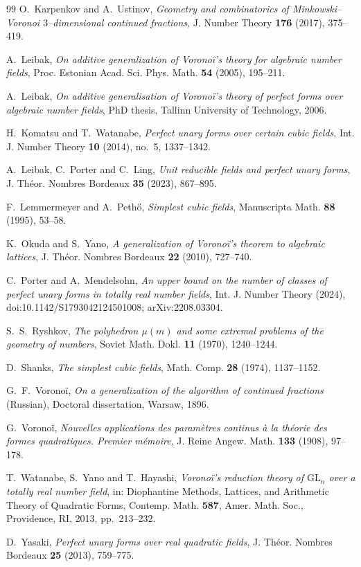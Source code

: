 \documentclass[11pt,reqno]{amsart}
\theoremstyle{plain}
\theoremstyle{definition}
\newcommand{\GL}{\mathrm{GL}}
\begin{document}
\begin{thebibliography}{99}
O.~Karpenkov and A.~Ustinov, \emph{Geometry and combinatorics of Minkowski--Voronoi $3$--dimensional
continued fractions}, J. Number Theory \textbf{176} (2017), 375--419.

A.~Leibak, \emph{On additive generalization of Vorono\"i's theory for algebraic number fields}, Proc.
Estonian Acad. Sci. Phys. Math. \textbf{54} (2005), 195--211.

A.~Leibak, \emph{On additive generalisation of Vorono\"i's theory of perfect forms over algebraic number
fields}, PhD thesis, Tallinn University of Technology, 2006.

H.~Komatsu and T.~Watanabe, \emph{Perfect unary forms over certain cubic fields}, Int. J. Number Theory
\textbf{10} (2014), no.~5, 1337--1342.

A.~Leibak, C.~Porter and C.~Ling, \emph{Unit reducible fields and perfect unary forms}, J. Th\'eor. Nombres
Bordeaux \textbf{35} (2023), 867--895.

F.~Lemmermeyer and A.~Peth\H o, \emph{Simplest cubic fields}, Manuscripta Math. \textbf{88} (1995),
53--58.

K.~Okuda and S.~Yano, \emph{A generalization of Vorono\"i's theorem to algebraic lattices},
J. Th\'eor. Nombres Bordeaux \textbf{22} (2010), 727--740.

C.~Porter and A.~Mendelsohn, \emph{An upper bound on the number of classes of perfect unary forms in totally
real number fields}, Int. J. Number Theory (2024), doi:10.1142/S1793042124501008; arXiv:2208.03304.

S.~S.~Ryshkov, \emph{The polyhedron $\mu(m)$ and some extremal problems of the geometry of numbers},
Soviet Math. Dokl. \textbf{11} (1970), 1240--1244.

D.~Shanks, \emph{The simplest cubic fields}, Math. Comp. \textbf{28} (1974), 1137--1152.

G.~F.~Vorono\"i, \emph{On a generalization of the algorithm of continued fractions} (Russian), Doctoral
dissertation, Warsaw, 1896.

G.~Vorono\"i, \emph{Nouvelles applications des param\`etres continus \`a la th\'eorie des formes
quadratiques. Premier m\'emoire}, J. Reine Angew. Math. \textbf{133} (1908), 97--178.

T.~Watanabe, S.~Yano and T.~Hayashi, \emph{Vorono\"i's reduction theory of $\GL_n$ over a totally real
number field}, in: Diophantine Methods, Lattices, and Arithmetic Theory of Quadratic Forms, Contemp. Math.
\textbf{587}, Amer. Math. Soc., Providence, RI, 2013, pp.~213--232.

D.~Yasaki, \emph{Perfect unary forms over real quadratic fields}, J. Th\'eor. Nombres Bordeaux \textbf{25}
(2013), 759--775.

\end{thebibliography}
\end{document}
